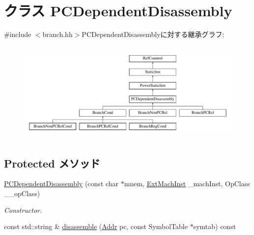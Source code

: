 \hypertarget{classPowerISA_1_1PCDependentDisassembly}{
\section{クラス PCDependentDisassembly}
\label{classPowerISA_1_1PCDependentDisassembly}
}


{\ttfamily \#include $<$branch.hh$>$}PCDependentDisassemblyに対する継承グラフ:\begin{figure}[H]
\begin{center}
\leavevmode
\includegraphics[height=5cm]{classPowerISA_1_1PCDependentDisassembly}
\end{center}
\end{figure}
\subsection*{Protected メソッド}
\begin{DoxyCompactItemize}
\item 
\hyperlink{classPowerISA_1_1PCDependentDisassembly_a14ed7b5973f7faa16a2692e177b7b8e3}{PCDependentDisassembly} (const char $\ast$mnem, \hyperlink{classStaticInst_a5605d4fc727eae9e595325c90c0ec108}{ExtMachInst} \_\-machInst, OpClass \_\-\_\-opClass)
\begin{DoxyCompactList}\small\item\em Constructor. \item\end{DoxyCompactList}\item 
const std::string \& \hyperlink{classPowerISA_1_1PCDependentDisassembly_a8b5fcb5ee981f062dfbdd09d676922f6}{disassemble} (\hyperlink{base_2types_8hh_af1bb03d6a4ee096394a6749f0a169232}{Addr} pc, const SymbolTable $\ast$symtab) const 
\end{DoxyCompactItemize}
